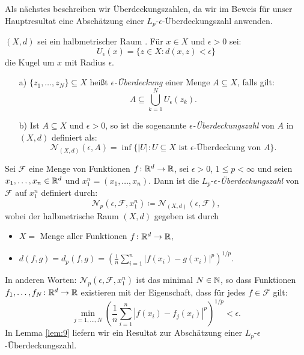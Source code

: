 Als nächstes beschreiben wir Überdeckungszahlen, da wir im Beweis für unser Hauptresultat eine Abschätzung einer $L_p\text{-}\epsilon$-Überdeckungszahl anwenden.
\begin{defn}
\label{ueberdeckung}
$(X, d)$ sei ein halbmetrischer Raum \cite{forster2016} . Für $x \in X$ und $\epsilon > 0$ sei:
$$U_{\epsilon}(x) = \{z \in X : d(x, z) < \epsilon\}$$
die Kugel um $x$ mit Radius $\epsilon$.
\begin{itemize}
\item[a)] $\{z_1,\dots,z_N\} \subseteq X$ heißt $\epsilon$\textit{-Überdeckung} einer Menge $A \subseteq X$, falls gilt:
$$A \subseteq \bigcup_{k = 1}^N U_{\epsilon}(z_k).$$
\item[b)] Ist $A \subseteq X$ und $\epsilon > 0$, so ist die sogenannte $\epsilon$\textit{-Überdeckungszahl} von $A$ in $(X,d)$ definiert als:
$$\mathcal{N}_{(X,d)}(\epsilon, A) = \inf\big\{|U| : U \subseteq X \text{ ist } \epsilon\text{-Überdeckung von } A\big\}.$$   
\end{itemize}
\end{defn} 
\begin{defn}
\label{lpe}
Sei $\mathcal{F}$ eine Menge von Funktionen $f\colon \mathbb{R}^d \to \mathbb{R}$, sei $\epsilon > 0$, $1 \leq p < \infty$ und seien $x_1,\dots,x_n \in \mathbb{R}^d$ und $x_1^n = (x_1,\dots,x_n).$ Dann ist die $L_p$-$\epsilon$\textit{-Überdeckungszahl} von $\mathcal{F}$ auf $x_1^n$ definiert durch:
$$\mathcal{N}_p(\epsilon, \mathcal{F}, x_1^n) \coloneqq \mathcal{N}_{(X,d)}(\epsilon, \mathcal{F}),$$
wobei der halbmetrische Raum $(X, d)$ gegeben ist durch
\begin{itemize}
\item $X = $ Menge aller Funktionen $f\colon \mathbb{R}^d \to \mathbb{R}$,
\item $d(f, g) = d_p(f, g) = (\frac{1}{n}\sum_{i = 1}^n |f(x_i) - g(x_i)|^p)^{1/p} .$
\end{itemize}
\end{defn}
In anderen Worten: $\mathcal{N}_p(\epsilon, \mathcal{F}, x_1^n)$ ist das minimal $N \in \mathbb{N}$, so dass Funktionen $f_1,\dots,f_N\colon \mathbb{R}^d \to \mathbb{R}$ existieren mit der Eigenschaft, dass für jedes $f \in \mathcal{F}$ gilt:
$$\min_{j = 1,\dots,N}(\frac{1}{n}\sum_{i = 1}^n|f(x_i) - f_j(x_i)|^p)^{1/p} < \epsilon.$$
In Lemma \ref{lem:9} liefern wir ein Resultat zur Abschätzung einer $L_p$-$\epsilon$-Überdeckungszahl.

